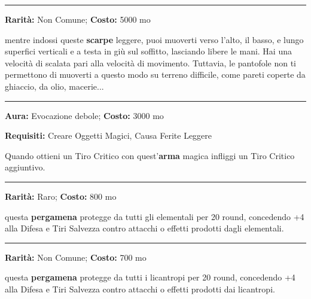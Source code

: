 \begin{multicols}{2}
\smallskip\noindent\rule{\linewidth}{2pt}  \hypertarget{PantofoledelRagno}{}\medskip{}\noindent\label{PantofoledelRagno}

\textbf{Rarità:} Non Comune; \textbf{Costo:} 5000 mo

mentre indossi queste \textbf{scarpe} leggere, puoi muoverti verso l'alto, il basso, e lungo superfici verticali e a testa in giù sul soffitto, lasciando libere le mani. Hai una velocità di scalata pari alla velocità di movimento. Tuttavia, le pantofole non ti permettono di muoverti a questo modo su terreno difficile, come pareti coperte da ghiaccio, da olio, macerie...

\smallskip\noindent\rule{\linewidth}{2pt}  \hypertarget{Perfida}{}\medskip{}\noindent\label{Perfida}

\textbf{Aura:} Evocazione debole; \textbf{Costo:} 3000 mo

\textbf{Requisiti:} Creare Oggetti Magici, Causa Ferite Leggere

Quando ottieni un Tiro Critico con quest'\textbf{arma} magica infliggi un Tiro Critico aggiuntivo.

\smallskip\noindent\rule{\linewidth}{2pt}  \hypertarget{Pergamenacontroglielementali}{}\medskip{}\noindent\label{Pergamenacontroglielementali}

\textbf{Rarità:} Raro; \textbf{Costo:} 800 mo

questa \textbf{pergamena} protegge da tutti gli elementali per 20 round, concedendo +4 alla Difesa e Tiri Salvezza contro attacchi o effetti prodotti dagli elementali.

\smallskip\noindent\rule{\linewidth}{2pt}  \hypertarget{Pergamenacontroilicantropi}{}\medskip{}\noindent\label{Pergamenacontroilicantropi}

\textbf{Rarità:} Non Comune; \textbf{Costo:} 700 mo

questa \textbf{pergamena} protegge da tutti i licantropi per 20 round, concedendo +4 alla Difesa e Tiri Salvezza contro attacchi o effetti prodotti dai licantropi.


\end{multicols}

